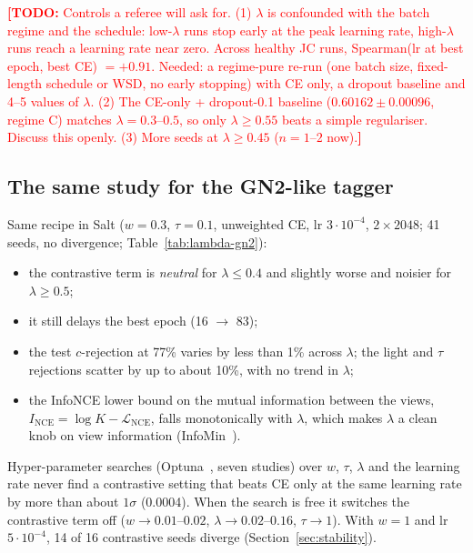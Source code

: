 \documentclass[11pt,a4paper]{article}
\newcommand{\todo}[1]{\textcolor{red}{\textbf{[TODO:} #1\textbf{]}}}
\begin{document}
\todo{Controls a referee will ask for. (1) $\lambda$ is confounded with the batch regime and
the schedule: low-$\lambda$ runs stop early at the peak learning rate, high-$\lambda$ runs
reach a learning rate near zero. Across healthy JC runs, Spearman(lr at best epoch, best CE)
$=+0.91$. Needed: a regime-pure re-run (one batch size, fixed-length schedule or WSD, no early
stopping) with CE only, a dropout baseline and 4--5 values of $\lambda$. (2) The CE-only +
dropout-0.1 baseline ($0.60162\pm0.00096$, regime C) matches $\lambda=0.3$--$0.5$, so only
$\lambda\ge0.55$ beats a simple regulariser. Discuss this openly. (3) More seeds at
$\lambda\ge0.45$ ($n=1$--$2$ now).}

\subsection{The same study for the GN2-like tagger}
Same recipe in Salt ($w=0.3$, $\tau=0.1$, unweighted CE, lr $3\cdot10^{-4}$,
$2\times2048$; 41 seeds, no divergence; Table~\ref{tab:lambda-gn2}):
\begin{itemize}
  \item the contrastive term is \emph{neutral} for $\lambda\le0.4$ and slightly worse and
        noisier for $\lambda\ge0.5$;
  \item it still delays the best epoch (16 $\to$ 83);
  \item the test $c$-rejection at 77\% varies by less than 1\% across $\lambda$; the light
        and $\tau$ rejections scatter by up to about 10\%, with no trend in $\lambda$;
  \item the InfoNCE lower bound on the mutual information between the views,
        $I_{\mathrm{NCE}}=\log K-\mathcal{L}_{\mathrm{NCE}}$, falls monotonically with
        $\lambda$, which makes $\lambda$ a clean knob on view information (InfoMin~\citep{tian2020makes}).
\end{itemize}
Hyper-parameter searches (Optuna~\citep{Akiba2019Optuna}, seven studies) over $w$, $\tau$,
$\lambda$ and the learning rate never find a contrastive setting that beats CE only at the
same learning rate by more than about $1\sigma$ (0.0004). When the search is free it switches
the contrastive term off ($w\to0.01$--$0.02$, $\lambda\to0.02$--$0.16$, $\tau\to1$). With $w=1$ and lr $5\cdot10^{-4}$,
14 of 16 contrastive seeds diverge (Section~\ref{sec:stability}).
\end{document}
